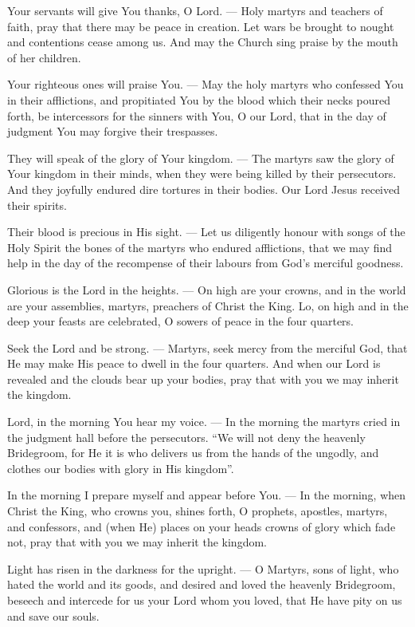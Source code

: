 \documentclass[12pt,twoside,a5paper]{article}
\begin{document}
\begin{halfparskip}
  Your servants will give You thanks, O Lord. --- Holy martyrs and teachers of faith, pray that there may be peace in creation. Let wars be brought to nought and contentions cease among us. And may the Church sing praise by the mouth of her children.

  Your righteous ones will praise You. --- May the holy martyrs who confessed You in their afflictions, and propitiated You by the blood which their necks poured forth, be intercessors for the sinners with You, O our Lord, that in the day of judgment You may forgive their trespasses.

  They will speak of the glory of Your kingdom. --- The martyrs saw the glory of Your kingdom in their minds, when they were being killed by their persecutors. And they joyfully endured dire tortures in their bodies. Our Lord Jesus received their spirits.

  Their blood is precious in His sight. --- Let us diligently honour with songs of the Holy Spirit the bones of the martyrs who endured afflictions, that we may find help in the day of the recompense of their labours from God's merciful goodness.

  Glorious is the Lord in the heights. --- On high are your crowns, and in the world are your assemblies, martyrs, preachers of Christ the King. Lo, on high and in the deep your feasts are celebrated, O sowers of peace in the four quarters.

  Seek the Lord and be strong. --- Martyrs, seek mercy from the merciful God, that He may make His peace to dwell in the four quarters. And when our Lord is revealed and the clouds bear up your bodies, pray that with you we may inherit the kingdom.

  Lord, in the morning You hear my voice. --- In the morning the martyrs cried in the judgment hall before the persecutors. ``We will not deny the heavenly Bridegroom, for He it is who delivers us from the hands of the ungodly, and clothes our bodies with glory in His kingdom''.

  In the morning I prepare myself and appear before You. --- In the morning, when Christ the King, who crowns you, shines forth, O prophets, apostles, martyrs, and confessors, and (when He) places on your heads crowns of glory which fade not, pray that with you we may inherit the kingdom.

  Light has risen in the darkness for the upright. --- O Martyrs, sons of light, who hated the world and its goods, and desired and loved the heavenly Bridegroom, beseech and intercede for us your Lord whom you loved, that He have pity on us and save our souls.


\end{halfparskip}
\end{document}
